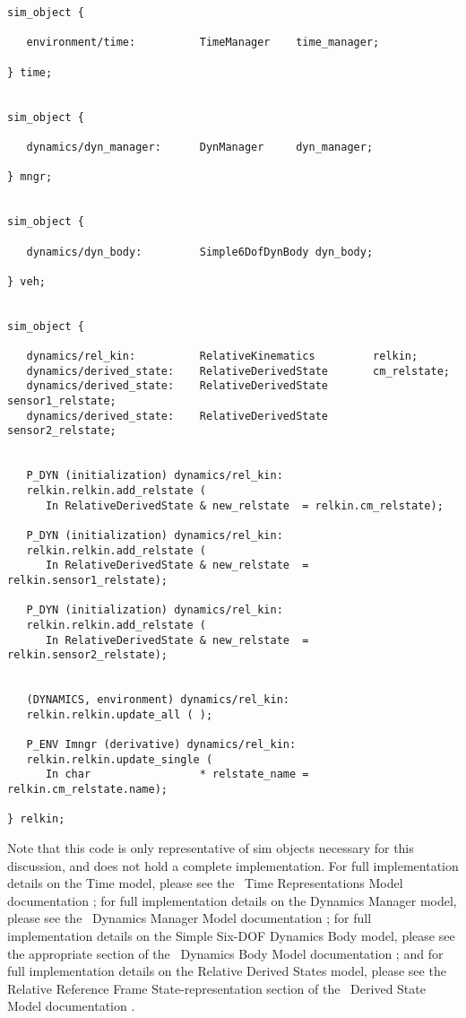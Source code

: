 \begin{verbatim}
sim_object {

   environment/time:          TimeManager    time_manager;

} time;


sim_object {

   dynamics/dyn_manager:      DynManager     dyn_manager;

} mngr;


sim_object {

   dynamics/dyn_body:         Simple6DofDynBody dyn_body;

} veh;


sim_object {

   dynamics/rel_kin:          RelativeKinematics         relkin;
   dynamics/derived_state:    RelativeDerivedState       cm_relstate;
   dynamics/derived_state:    RelativeDerivedState       sensor1_relstate;
   dynamics/derived_state:    RelativeDerivedState       sensor2_relstate;


   P_DYN (initialization) dynamics/rel_kin:
   relkin.relkin.add_relstate (
      In RelativeDerivedState & new_relstate  = relkin.cm_relstate);

   P_DYN (initialization) dynamics/rel_kin:
   relkin.relkin.add_relstate (
      In RelativeDerivedState & new_relstate  = relkin.sensor1_relstate);

   P_DYN (initialization) dynamics/rel_kin:
   relkin.relkin.add_relstate (
      In RelativeDerivedState & new_relstate  = relkin.sensor2_relstate);


   (DYNAMICS, environment) dynamics/rel_kin:
   relkin.relkin.update_all ( );

   P_ENV Imngr (derivative) dynamics/rel_kin:
   relkin.relkin.update_single (
      In char                 * relstate_name = relkin.cm_relstate.name);

} relkin;
\end{verbatim}

Note that this code is only representative of sim objects necessary for this
discussion, and does not hold a complete implementation. For full
implementation details on the Time model, please see the \JEODid\ Time
Representations Model documentation \cite{dynenv:TIME}; for full
implementation details on the Dynamics Manager model,
please see the \JEODid\ Dynamics Manager Model documentation
\cite{dynenv:DYNMANAGER}; for full implementation details on the Simple
Six-DOF Dynamics Body model, please see the appropriate section of the \JEODid\
Dynamics Body Model documentation \cite{dynenv:DYNBODY}; and for full
implementation details on the Relative Derived States model, please see the
Relative Reference Frame State-representation section of the
\JEODid\ Derived State Model documentation \cite{dynenv:DERIVEDSTATE}.

